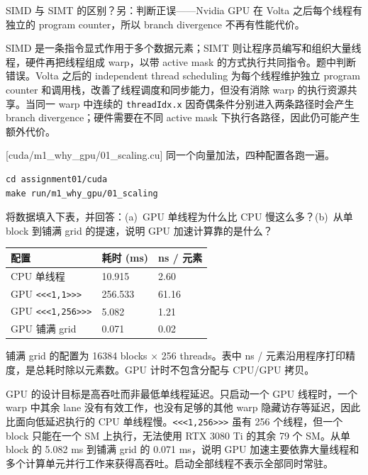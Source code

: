 \documentclass[11pt,a4paper,fontset=none]{ctexart}
\begin{document}
SIMD 与 SIMT 的区别？另：判断正误——Nvidia GPU 在 Volta 之后每个线程有独立的 program counter，所以 branch divergence 不再有性能代价。

\begin{tcolorbox}[title={1.4 作答（讨论后整理）},breakable]
SIMD 是一条指令显式作用于多个数据元素；SIMT 则让程序员编写和组织大量线程，硬件再把线程组成 warp，以带 active mask 的方式执行共同指令。题中判断错误。Volta 之后的 independent thread scheduling 为每个线程维护独立 program counter 和调用栈，改善了线程调度和同步能力，但没有消除 warp 的执行资源共享。当同一 warp 中连续的 \texttt{threadIdx.x} 因奇偶条件分别进入两条路径时会产生 branch divergence；硬件需要在不同 active mask 下执行各路径，因此仍可能产生额外代价。
\end{tcolorbox}

[cuda/m1\_why\_gpu/01\_scaling.cu]
同一个向量加法，四种配置各跑一遍。

\begin{lstlisting}
cd assignment01/cuda
make run/m1_why_gpu/01_scaling
\end{lstlisting}

将数据填入下表，并回答：(a)~GPU 单线程为什么比 CPU 慢这么多？(b)~从单 block 到铺满 grid 的提速，说明 GPU 加速计算靠的是什么？

\begin{center}\small
\begin{tabular}{@{}lll@{}}
\toprule
配置 & 耗时 (ms) & ns / 元素 \\
\midrule
CPU 单线程 & 10.915 & 2.60 \\
GPU \texttt{<<<1,1>>>} & 256.533 & 61.16 \\
GPU \texttt{<<<1,256>>>} & 5.082 & 1.21 \\
GPU 铺满 grid & 0.071 & 0.02 \\
\bottomrule
\end{tabular}
\end{center}

\begin{tcolorbox}[title={1.5 补充记录}]
铺满 grid 的配置为 16384 blocks $\times$ 256 threads。表中 ns / 元素沿用程序打印精度，是总耗时除以元素数。GPU 计时不包含分配与 CPU/GPU 拷贝。

GPU 的设计目标是高吞吐而非最低单线程延迟。只启动一个 GPU 线程时，一个 warp 中其余 lane 没有有效工作，也没有足够的其他 warp 隐藏访存等延迟，因此比面向低延迟执行的 CPU 单线程慢。\texttt{<<<1,256>>>} 虽有 256 个线程，但一个 block 只能在一个 SM 上执行，无法使用 RTX 3080 Ti 的其余 79 个 SM。从单 block 的 5.082 ms 到铺满 grid 的 0.071 ms，说明 GPU 加速主要依靠大量线程和多个计算单元并行工作来获得高吞吐。启动全部线程不表示全部同时常驻。
\end{tcolorbox}
\end{document}
